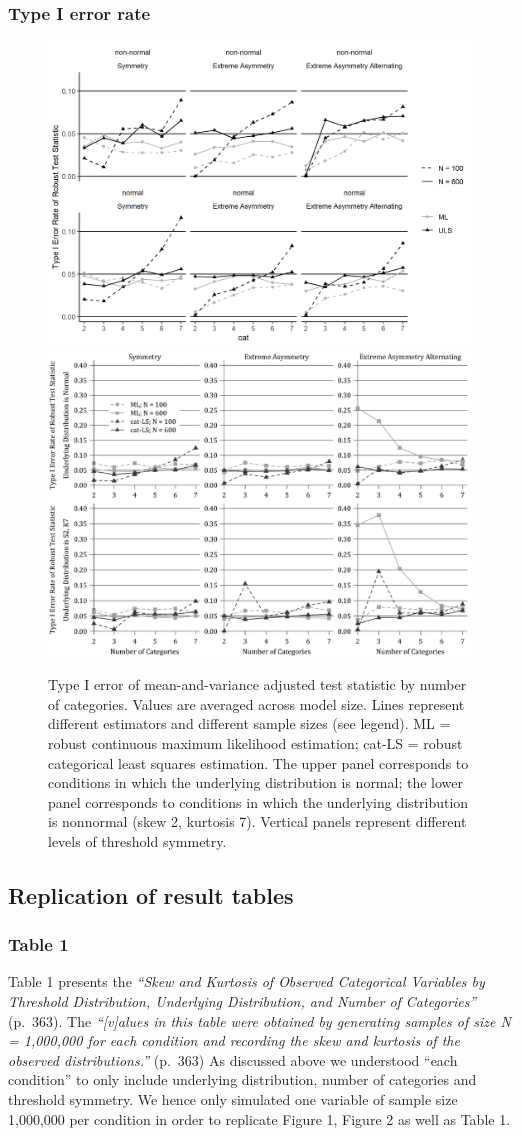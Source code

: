 \documentclass[10,a4paperpaper,]{article}
\begin{document}
\subsubsection{Type I error rate}
\begin{figure}
\includegraphics[width=0.49\linewidth]{./figures/fig_9} \includegraphics[width=0.49\linewidth]{./figures/fig9_original} \caption{Type I error of mean-and-variance adjusted test statistic by number of categories. Values are averaged across model size. Lines represent different estimators and different sample sizes (see legend). ML = robust continuous maximum likelihood estimation; cat-LS = robust categorical least squares estimation. The upper panel corresponds to conditions in which the underlying distribution is normal; the lower panel corresponds to conditions in which the underlying distribution is nonnormal (skew 2, kurtosis 7). Vertical panels represent different levels of threshold symmetry.}\label{fig:fig9}
\end{figure}

\subsection{Replication of result tables}

\subsubsection{Table 1}

Table 1 presents the \emph{``Skew and Kurtosis of Observed Categorical
Variables by Threshold Distribution, Underlying Distribution, and Number
of Categories''} (p.~363). The \emph{``{[}v{]}alues in this table were
obtained by generating samples of size N = 1,000,000 for each condition
and recording the skew and kurtosis of the observed distributions.''}
(p.~363) As discussed above we understood ``each condition'' to only
include underlying distribution, number of categories and threshold
symmetry. We hence only simulated one variable of sample size 1,000,000
per condition in order to replicate Figure 1, Figure 2 as well as Table
1.
\end{document}
